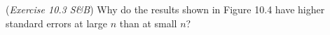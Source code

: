 (\textit{Exercise 10.3 S\&B})
Why do the results shown in Figure 10.4 have higher standard errors at
large $n$ than at small $n$?